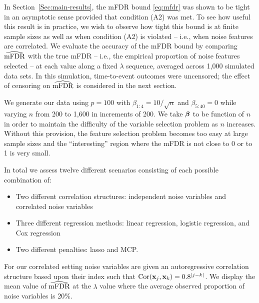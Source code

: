 In Section~\ref{Sec:main-results}, the mFDR bound \eqref{eq:mfdr} was shown to be tight in an asymptotic sense provided that condition (A2) was met.  To see how useful this result is in practice, we wish to observe how tight this bound is at finite sample sizes as well as when condition (A2) is violated -- i.e., when noise features are correlated.
We evaluate the accuracy of the mFDR bound by comparing $\widehat{\textrm{mFDR}}$ with the true mFDR -- i.e., the empirical proportion of noise features selected -- at each value along a fixed $\lambda$ sequence, averaged across 1,000 simulated data sets.
In this simulation, time-to-event outcomes were uncensored; the effect of censoring on $\widehat{\textrm{mFDR}}$ is considered in the next section.

We generate our data using $p = 100$ with $\beta_{1:4} = 10/\sqrt{n}$ and $\beta_{5:40} = 0$ while varying $n$ from 200 to 1,600 in increments of 200. We take $\boldsymbol{\beta}$ to be function of $n$ in order to maintain the difficulty of the variable selection problem as $n$ increases.
Without this provision, the feature selection problem becomes too easy at large sample sizes and the ``interesting'' region where the mFDR is not close to 0 or to 1 is very small.

In total we assess twelve different scenarios consisting of each possible combination of:
\begin{itemize}[leftmargin=*, labelindent=0.5cm]
\item Two different correlation structures: independent noise variables and correlated noise variables
\item Three different regression methods: linear regression, logistic regression, and Cox regression
\item Two different penalties: lasso and MCP. 
\end{itemize}
For our correlated setting noise variables are given an autoregressive correlation structure based upon their index such that $\textrm{Cor}(\mathbf{x}_j,\mathbf{x}_k) = 0.8^{|j - k|}$. We display the mean value of $\widehat{\textrm{mFDR}}$ at the $\lambda$ value where the average observed proportion of noise variables is 20\%.

